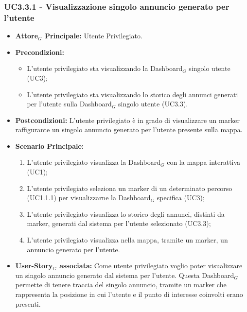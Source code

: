 \documentclass[11pt]{article}
\begin{document}
\begin{justify}
\subsubsection{\textbf{UC3.3.1 - Visualizzazione singolo annuncio generato per l'utente}}
\label{UC3.3.1}
\begin{itemize}
     \item \textbf{Attore$_G$ Principale:} Utente Privilegiato.
     \item \textbf{Precondizioni:}
        \begin{itemize}
    		\item L'utente privilegiato sta visualizzando la Dashboard$_G$ singolo utente (UC3);
    		\item L'utente privilegiato sta visualizzando lo storico degli annunci generati per l'utente sulla Dashboard$_G$ singolo utente (UC3.3).
        \end{itemize}
     \item \textbf{Postcondizioni:} L'utente privilegiato è in grado di visualizzare un marker raffigurante un singolo annuncio generato per l'utente presente sulla mappa.
     \item \textbf{Scenario Principale:}
        \begin{enumerate}
            \item L'utente privilegiato visualizza la Dashboard$_G$ con la mappa interattiva (UC1);
            \item L'utente privilegiato seleziona un marker di un determinato percorso (UC1.1.1) per visualizzarne la Dashboard$_G$ specifica (UC3);
            \item L'utente privilegiato visualizza lo storico degli annunci, distinti da marker, generati dal sistema per l'utente selezionato (UC3.3);
            \item L'utente privilegiato visualizza nella mappa, tramite un marker, un annuncio generato per l'utente.
        \end{enumerate}
     \item \textbf{User-Story$_G$ associata:}
     Come utente privilegiato voglio poter visualizzare un singolo annuncio generato dal sistema per l'utente. Questa Dashboard$_G$ permette di tenere traccia del singolo annuncio, tramite un marker che rappresenta la posizione in cui l'utente e il punto di interesse coinvolti erano presenti.
\end{itemize}


\end{justify}
\end{document}
